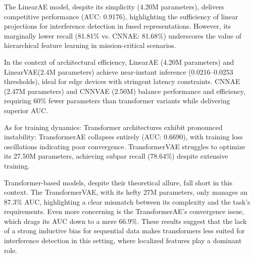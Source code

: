 \documentclass[12pt]{article}
\begin{document}
The LinearAE model, despite its simplicity (4.20M parameters), delivers competitive performance (AUC: 0.9176), highlighting the sufficiency of linear projections for interference detection in fused representations. However, its marginally lower recall (81.81\% vs. CNNAE: 81.68\%) underscores the value of hierarchical feature learning in mission-critical scenarios.

In the context of architectural efficiency, LinearAE (4.20M parameters) and LinearVAE(2.4M parameters) achieve near-instant inference (0.0216–0.0253 thresholds), ideal for edge devices with stringent latency constraints.  CNNAE (2.47M parameters) and CNNVAE (2.50M) balance performance and efficiency, requiring 60\% fewer parameters than transformer variants while delivering superior AUC.

As for training dynamics: Transformer architectures exhibit pronounced instability:  TransformerAE collapses entirely (AUC: 0.6690), with training loss oscillations indicating poor convergence.  TransformerVAE struggles to optimize its 27.50M parameters, achieving subpar recall (78.64\%) despite extensive training.


Transformer-based models, despite their theoretical allure, fall short in this context. The TransformerVAE, with its hefty 27M parameters, only manages an 87.3\% AUC, highlighting a clear mismatch between its complexity and the task’s requirements. Even more concerning is the TransformerAE’s convergence issue, which drags its AUC down to a mere 66.9\%. These results suggest that the lack of a strong inductive bias for sequential data makes transformers less suited for interference detection in this setting, where localized features play a dominant role.
\end{document}
